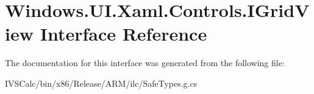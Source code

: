 \hypertarget{interface_windows_1_1_u_i_1_1_xaml_1_1_controls_1_1_i_grid_view}{}\section{Windows.\+U\+I.\+Xaml.\+Controls.\+I\+Grid\+View Interface Reference}
\label{interface_windows_1_1_u_i_1_1_xaml_1_1_controls_1_1_i_grid_view}


The documentation for this interface was generated from the following file\+:\begin{DoxyCompactItemize}
\item 
I\+V\+S\+Calc/bin/x86/\+Release/\+A\+R\+M/ilc/Safe\+Types.\+g.\+cs\end{DoxyCompactItemize}
